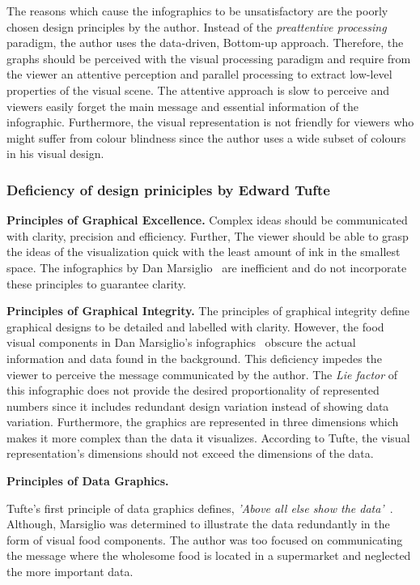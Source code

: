 The reasons which cause the infographics to be unsatisfactory are the poorly
chosen design principles by the author. Instead of the \textit{preattentive
processing} paradigm, the author uses the data-driven, Bottom-up approach.
Therefore, the graphs should be perceived with the visual processing paradigm
and require from the viewer an attentive perception and parallel processing to
extract low-level properties of the visual scene. The attentive approach is slow
to perceive and viewers easily forget the main message and essential information
of the infographic. Furthermore, the visual representation is not friendly for
viewers who might suffer from colour blindness since the author uses a wide
subset of colours in his visual design.

\subsubsection{Deficiency of design priniciples by Edward Tufte}

\textbf{Principles of Graphical Excellence.} Complex ideas should be
communicated with clarity, precision and efficiency. Further, The viewer should
be able to grasp the ideas of the visualization quick with the least amount of
ink in the smallest space. The infographics by Dan
Marsiglio~\cite{DanMarsiglio2008} are inefficient and do not incorporate these
principles to guarantee clarity.

\textbf{Principles of Graphical Integrity.} The principles of graphical
integrity define graphical designs to be detailed and labelled with clarity.
However, the food visual components in Dan Marsiglio's
infographics~\cite{DanMarsiglio2008} obscure the actual information and data
found in the background. This deficiency impedes the viewer to perceive the
message communicated by the author. The \textit{Lie factor} of this infographic
does not provide the desired proportionality of represented numbers since it
includes redundant design variation instead of showing data variation.
Furthermore, the graphics are represented in three dimensions which makes it
more complex than the data it visualizes. According to Tufte, the visual
representation's dimensions should not exceed the dimensions of the data. 

\textbf{Principles of Data Graphics.}


Tufte's first principle of data graphics defines, \textit{'Above all else show
the data'}~\cite{Tufte2001}. Although, Marsiglio was determined to illustrate the
data redundantly in the form of visual food components. The author was too
focused on communicating the message where the wholesome food is located in a
supermarket and neglected the more important data.


